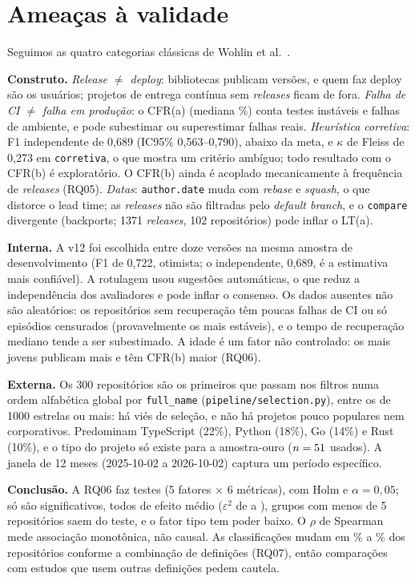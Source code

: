 \section{Ameaças à validade}

Seguimos as quatro categorias clássicas de Wohlin et al.~\cite{wohlin2012experimentation}.

\textbf{Construto.} \emph{Release $\neq$ deploy}: bibliotecas publicam versões, e quem faz deploy são os usuários;
projetos de entrega contínua sem \textit{releases} ficam de fora. \emph{Falha de CI $\neq$ falha em produção}: o CFR(a)
(mediana \NCfraMed\%) conta testes instáveis e falhas de ambiente, e pode subestimar ou superestimar falhas reais.
\emph{Heurística corretiva}: F1 independente de 0,689 (IC95\% 0,563--0,790), abaixo da meta, e $\kappa$ de Fleiss de
0,273 em \texttt{corretiva}, o que mostra um critério ambíguo; todo resultado com o CFR(b) é exploratório. O
CFR(b) ainda é acoplado mecanicamente à frequência de \textit{releases} (RQ05). \emph{Datas}: \texttt{author.date}
muda com \textit{rebase} e \textit{squash}, o que distorce o lead time; as \textit{releases} não são filtradas pelo
\textit{default branch}, e o \texttt{compare} divergente (backports; 1371 \textit{releases}, 102 repositórios) pode
inflar o LT(a).

\textbf{Interna.} A v12 foi escolhida entre doze versões na mesma amostra de desenvolvimento (F1 de 0,722, otimista; o
independente, 0,689, é a estimativa mais confiável). A rotulagem usou sugestões automáticas, o que reduz a
independência dos avaliadores e pode inflar o consenso. Os dados ausentes não são aleatórios: os \NRecSemValor{}
repositórios sem recuperação têm poucas falhas de CI ou só episódios censurados (provavelmente os mais estáveis), e o
tempo de recuperação mediano tende a ser subestimado. A idade é um fator não controlado: os mais jovens publicam mais e têm CFR(b) maior (RQ06).

\textbf{Externa.} Os 300 repositórios são os primeiros que passam nos filtros numa ordem alfabética global por
\texttt{full\_name} (\texttt{pipeline/selection.py}), entre os de 1000 estrelas ou mais: há viés de seleção, e não há
projetos pouco populares nem corporativos. Predominam TypeScript (22\%), Python (18\%), Go (14\%) e Rust (10\%), e o tipo do projeto só existe para a
amostra-ouro ($n = 51$ usados). A janela de 12 meses
(2025-10-02 a 2026-10-02) captura um período específico.

\textbf{Conclusão.} A RQ06 faz \NSeisTestes{} testes (5 fatores $\times$ 6 métricas), com Holm e $\alpha = 0{,}05$; só
\NSeisSig{} são significativos, todos de efeito médio ($\varepsilon^2$ de \NEpsSigMin{} a \NEpsSigMax{}), grupos com
menos de 5 repositórios saem do teste, e o fator tipo tem poder baixo. O $\rho$ de Spearman mede associação
monotônica, não causal. As classificações mudam em \NSensUmTresPct\% a \NSensUmDoisPct\% dos repositórios conforme a
combinação de definições (RQ07), então comparações com estudos que usem outras definições pedem cautela.
